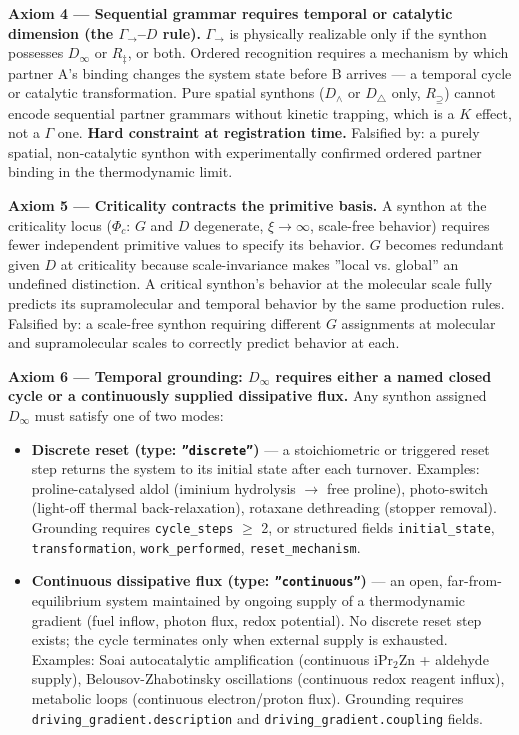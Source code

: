 \documentclass[12pt,a4paper]{article}
\begin{document}
\textbf{Axiom 4 --- Sequential grammar requires temporal or catalytic dimension (the $\Gamma_{\to}$--$D$ rule).}
$\Gamma_{\to}$ is physically realizable only if the synthon possesses $D_{\infty}$ or $R_{\ddagger}$, or both. Ordered recognition requires a mechanism by which partner A's binding changes the system state before B arrives --- a temporal cycle or catalytic transformation. Pure spatial synthons ($D_{\wedge}$ or $D_{\bigtriangleup}$ only, $R_{\supseteq}$) cannot encode sequential partner grammars without kinetic trapping, which is a $K$ effect, not a $\Gamma$ one. \textbf{Hard constraint at registration time.} Falsified by: a purely spatial, non-catalytic synthon with experimentally confirmed ordered partner binding in the thermodynamic limit.

\textbf{Axiom 5 --- Criticality contracts the primitive basis.}
A synthon at the criticality locus ($\Phi_c$: $G$ and $D$ degenerate, $\xi \to \infty$, scale-free behavior) requires fewer independent primitive values to specify its behavior. $G$ becomes redundant given $D$ at criticality because scale-invariance makes ''local vs. global'' an undefined distinction. A critical synthon's behavior at the molecular scale fully predicts its supramolecular and temporal behavior by the same production rules. Falsified by: a scale-free synthon requiring different $G$ assignments at molecular and supramolecular scales to correctly predict behavior at each.

\textbf{Axiom 6 --- Temporal grounding: $D_{\infty}$ requires either a named closed cycle or a continuously supplied dissipative flux.}
Any synthon assigned $D_{\infty}$ must satisfy one of two modes:

\begin{itemize}
    \item \textbf{Discrete reset (type: \texttt{''discrete''})} --- a stoichiometric or triggered reset step returns the system to its initial state after each turnover. Examples: proline-catalysed aldol (iminium hydrolysis $\to$ free proline), photo-switch (light-off thermal back-relaxation), rotaxane dethreading (stopper removal). Grounding requires \texttt{cycle\_steps} $\geq$ 2, or structured fields \texttt{initial\_state}, \texttt{transformation}, \texttt{work\_performed}, \texttt{reset\_mechanism}.
    \item \textbf{Continuous dissipative flux (type: \texttt{''continuous''})} --- an open, far-from-equilibrium system maintained by ongoing supply of a thermodynamic gradient (fuel inflow, photon flux, redox potential). No discrete reset step exists; the cycle terminates only when external supply is exhausted. Examples: Soai autocatalytic amplification (continuous iPr$_2$Zn + aldehyde supply), Belousov-Zhabotinsky oscillations (continuous redox reagent influx), metabolic loops (continuous electron/proton flux). Grounding requires \texttt{driving\_gradient.description} and \texttt{driving\_gradient.coupling} fields.
\end{itemize}
\end{document}
